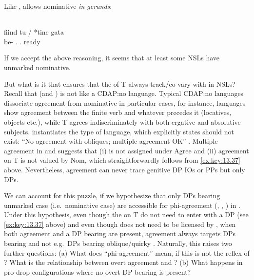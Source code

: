 \documentclass[output=paper]{langsci/langscibook}
\begin{document}
\begin{exe}
Like ,  allows nominative \emph{in gerunds}:

\ea\label{ex:key:13.42} \citep{Alboiu2009}\\
    \gll fiind tu / *tine gata\\
    be-\Ger{}    \Ssg.\Nom{} {} \hphantom{*}\Ssg.\Acc{} ready\\
    \glt
\z

If we accept the above reasoning, it seems that at least some \glspl{NSL} have
unmarked nominative.

But what is it that ensures that the  of T always track/co-vary
with \Nom{} in \glspl{NSL}? Recall that  (and ) is not
like a CDAP:no language. Typical CDAP:no languages dissociate agreement from
nominative in particular cases, for instance,  languages show agreement
between the finite verb and whatever precedes it (locatives, objects etc.),
while  T agrees indiscriminately with both ergative and
absolutive subjects.  instantiates
the type of language, which \citet{Baker2008} explicitly states should not
exist: “No agreement with obliques; multiple agreement OK” \parencite[223,
(113d)]{Baker2008}. Multiple agreement in  and  suggests
that (i) \Nom{} is not assigned under Agree and (ii) agreement on T is not
valued by Nom, which straightforwardly follows from \eqref{ex:key:13.37} above.
Nevertheless, agreement can never trace genitive DP
\glspl{IO} or PPs but only \Nom{} DPs.

We can account for this puzzle, if we hypothesize that only DPs bearing
unmarked case (i.e.\ nominative case) are accessible for
phi-agreement (\citealt{Bobaljik2008}, \citealt{Preminger2014},
\citealt{Baker2015}) in . Under this hypothesis, even though the
 on T do not need to enter  with a DP (see
\eqref{ex:key:13.37} above) and even though \Nom{} does not need to be licensed
by , when both agreement and a DP bearing \Nom{} are present,
agreement always targets DPs bearing \Nom{} and not e.g.\ DPs bearing
oblique/quirky \Gen. Naturally, this raises two further questions: (a) What
does \enquote{phi-agreement} mean, if this is not the reflex of ?
What is the relationship between overt agreement and ? (b) What
happens in pro-drop configurations where no overt DP bearing \Nom{} is present?


\end{exe}
\end{document}

